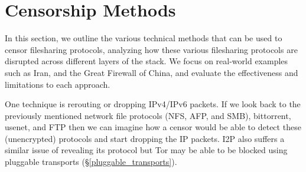 




\section{Censorship Methods}\label{censorship}

In this section, we outline the various technical methods that can be used to
censor filesharing protocols, analyzing how these various filesharing protocols
are disrupted across different layers of the stack. We focus on real-world
examples such as Iran, and the Great Firewall of China, and evaluate the
effectiveness and limitations to each approach.

One technique is rerouting or dropping IPv4/IPv6 packets.
\cite{wendzelSurveyInternetCensorship2025} If we look back to the previously
mentioned network file protocols (NFS, AFP, and SMB), bittorrent, usenet, and
FTP then we can imagine how a censor would be able to detect these (unencrypted)
protocols and start dropping the IP packets. I2P also suffers a similar issue of
revealing its protocol but Tor may be able to be blocked using pluggable
transports (\S \ref{pluggable_transports}).

